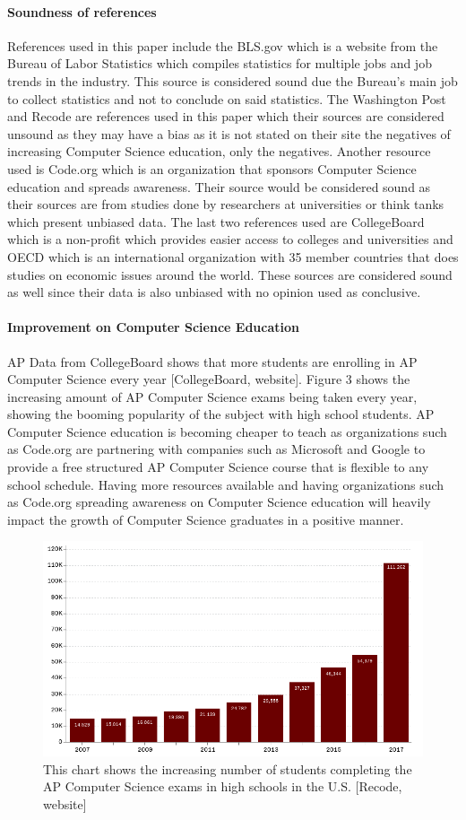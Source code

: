 \documentclass[12pt, letterpaper]{report}
\begin{document}
\paragraph*{Soundness of references \\}
References used in this paper include the BLS.gov which is a website from the Bureau of Labor Statistics which compiles statistics for multiple jobs and job trends in the industry. This source is considered sound due the Bureau's main job to collect statistics and not to conclude on said statistics. The Washington Post and Recode are references used in this paper which their sources are considered unsound as they may have a bias as it is not stated on their site the negatives of increasing Computer Science education, only the negatives. Another resource used is Code.org which is an organization that sponsors Computer Science education and spreads awareness. Their source would be considered sound as their sources are from studies done by researchers at universities or think tanks which present unbiased data. The last two references used are CollegeBoard which is a non-profit which provides easier access to colleges and universities and OECD which is an international organization with 35 member countries that does studies on economic issues around the world. These sources are considered sound as well since their data is also unbiased with no opinion used as conclusive. 

\paragraph*{Improvement on Computer Science Education \\}
AP Data from CollegeBoard shows that more students are enrolling in AP Computer Science every year [CollegeBoard, website]. Figure 3 shows the increasing amount of AP Computer Science exams being taken every year, showing the booming popularity of the subject with high school students. AP Computer Science education is becoming cheaper to teach as organizations such as Code.org are partnering with companies such as Microsoft and Google to provide a free structured AP Computer Science course that is flexible to any school schedule. Having more resources available and having organizations such as Code.org spreading awareness on Computer Science education will heavily impact the growth of Computer Science graduates in a positive manner.

\begin{figure}[H]
    \centering
    \includegraphics[scale=0.85]{figure14.png}
    \captionsetup{justification=centering}
    \caption{This chart shows the increasing number of students completing the AP Computer Science exams in high schools in the U.S. [Recode, website]}
\end{figure}
\end{document}
